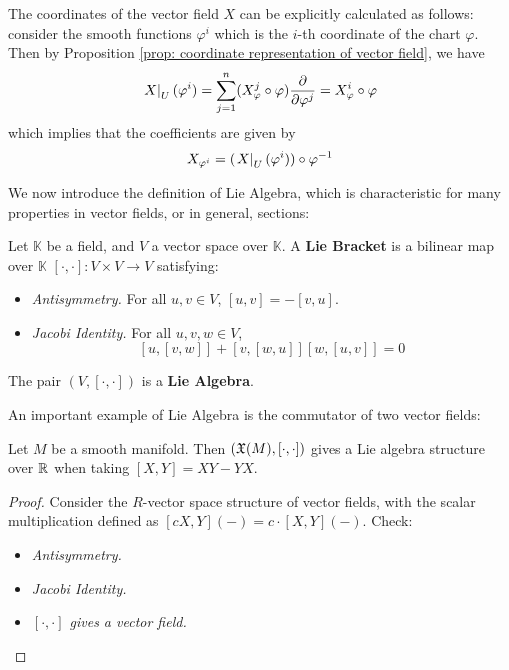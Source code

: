 \documentclass{article}
\begin{document}
\begin{remark}
    The coordinates of the vector field $X$ can be explicitly calculated as follows: consider the smooth functions $\varphi^i$ which is the $i$-th coordinate of the chart $\varphi$. Then by Proposition \ref{prop: coordinate representation of vector field}, we have
    \[
        \left.X\right|_{U}(\varphi^i) 
        = \sum_{j = 1}^{n} (X_{\varphi}^j \circ \varphi) \frac{\partial}{\partial \varphi^j}
        = X_{\varphi}^i \circ \varphi
    \]
    which implies that the coefficients are given by 
    \[
        X_{\varphi^i} = (\left.X\right|_{U}(\varphi^i)) \circ \varphi^{-1}
    \]
\end{remark}

We now introduce the definition of Lie Algebra, which is characteristic for many properties in vector fields, or in general, sections:

\begin{definition}
    Let $\mathbb{K}$ be a field, and $V$ a vector space over $\mathbb{K}$. A \textbf{Lie Bracket} is a bilinear map over $\mathbb{K}$ $[\cdot, \cdot]: V \times V \to V$ satisfying:
    \begin{itemize}
        \item \emph{Antisymmetry.} For all $u, v \in V$, $[u, v] = -[v, u]$.
        \item \emph{Jacobi Identity.} For all $u, v, w \in V$, 
        \[
            [u, [v, w]] + [v, [w, u]] [w, [u, v]] = 0
        \]
    \end{itemize} 
    The pair $(V, [\cdot, \cdot])$ is a \textbf{Lie Algebra}.
\end{definition}

An important example of Lie Algebra is the commutator of two vector fields:

\begin{proposition}
    Let $M$ be a smooth manifold. Then $(\mathfrak{X}(M), [\cdot, \cdot])$ gives a Lie algebra structure over $\mathbb{R}$ when taking $[X, Y] = XY - YX$.
\end{proposition}

\begin{proof}
    Consider the $R$-vector space structure of vector fields, with the scalar multiplication defined as $[cX, Y](-) = c\cdot [X, Y](-)$. Check:
    \begin{itemize}
        \item \emph{Antisymmetry.}
        \item \emph{Jacobi Identity.}
        \item \emph{$[\cdot, \cdot]$ gives a vector field.}
    \end{itemize}
\end{proof}
\end{document}
